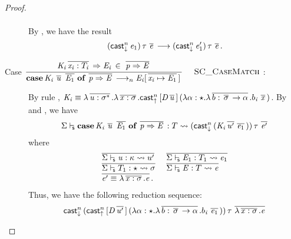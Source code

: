 \begin{proof}
\begin{description}
\[\begin{array}{l}
        \end{array} \] 
    By , we have the result
\[ (  \mathsf{cast}_{\downarrow}^n \, \mathit{e_{{\mathrm{1}}}}  ) \, \tau \, \,\overline{  \mathit{e}  }\,  \longrightarrow  (  \mathsf{cast}_{\downarrow}^n \, \mathit{e'_{{\mathrm{1}}}}  ) \, \tau \, \,\overline{  \mathit{e}  }\,. \]
        \item[Case \scriptsize{${\displaystyle\frac{\begin{array}{l} {\mathit{K_{\mathit{i}}} \,\overline{ \mathit{x_{\mathit{i}}} : T_{\mathit{i}} }\, \Rightarrow \mathit{E_{\mathit{i}}} \, \in \, \,\overline{ \mathit{p} \Rightarrow \mathit{E} }\,} \end{array}}{ \mathbf{case} \, \mathit{K_{\mathit{i}}} \, \,\overline{ \mathit{u} }\, \, \,\overline{ \mathit{E_{{\mathrm{1}}}} }\, \, \mathbf{of} \, \,\overline{ \mathit{p} \Rightarrow \mathit{E} }\, \longrightarrow_n \mathit{E_{\mathit{i}}} [ \,\overline{ \mathit{x_{\mathit{i}}} \mapsto \mathit{E_{{\mathrm{1}}}} }\, ] \,}\quad\textsc{ {\textsc{SC\_CaseMatch}}{} }}$}:] $\quad$ \\
        By rule , $\mathit{K_{\mathit{i}}}  \equiv  \lambda  \,\overline{  \mathit{u}  :  \sigma  ^{*}  }\,  .  \lambda  \,\overline{  \mathit{x}  :  \sigma  }\,  .  \mathsf{cast}_{\uparrow}^n \, [  \mathit{D}    \,\overline{  \mathit{u}  }\,  ] \,  (  \lambda  \alpha  :  \star  .  \lambda  \,\overline{  b  :  \,\overline{  \sigma  }\,  \rightarrow  \alpha  }\,  .  b_{\mathit{i}} \, \,\overline{  \mathit{x}  }\,  )$. By
 and , we have 
        \[
         \Sigma  \vdash_{\!\!\mathsf{s} }  \mathbf{case} \, \mathit{K_{\mathit{i}}} \, \,\overline{  \mathit{u}  }\, \, \,\overline{  \mathit{E_{{\mathrm{1}}}}  }\, \, \mathbf{of} \, \,\overline{  \mathit{p}  \Rightarrow  \mathit{E}  }\,  :  T   \rightsquigarrow   (  \mathsf{cast}_{\downarrow}^n \, (  \mathit{K_{\mathit{i}}}  \,\overline{  \mathit{u'}  }\,  \,\overline{  \mathit{e_{{\mathrm{1}}}}  }\,  )  ) \, \tau \, \,\overline{  \mathit{e'}  }\, 
        \]
where
        \[ \begin{array}{ll}
                \,\overline{   \Sigma  \labeledjudge{s}  \ottnt{u}  :  \kappa   \rightsquigarrow   u'   }\,
                & \,\overline{   \Sigma  \labeledjudge{s}  \ottnt{E_{{\mathrm{1}}}}  :  T_{{\mathrm{1}}}   \rightsquigarrow   \ottnt{e_{{\mathrm{1}}}}   }\, \\
                \,\overline{   \Sigma  \labeledjudge{s}  T_{{\mathrm{1}}}  :  \star   \rightsquigarrow   \sigma   }\,
                & \,\overline{   \Sigma  \labeledjudge{s}  \ottnt{E}  :  T   \rightsquigarrow   \ottnt{e}   }\, \\
                \,\overline{  \ottnt{e'}  \equiv  \lambda  \,\overline{  \ottmv{x}  \ottsym{:}  \sigma  }\,  \ottsym{.}  \ottnt{e}  }\,.
        \end{array} \]
        Thus, we have the following reduction sequence:
        \begin{align*}
            &\mathsf{cast}_{\downarrow}^n \, \ottsym{(}  \mathsf{cast}_{\uparrow}^n \, \ottsym{[}  \ottmv{D}    \,\overline{  \ottnt{u'}  }\,  \ottsym{]} \,  \ottsym{(}  \lambda  \alpha  \ottsym{:}  \star  \ottsym{.}  \lambda  \,\overline{  b  \ottsym{:}  \,\overline{  \sigma  }\,  \rightarrow  \alpha  }\,  \ottsym{.}  b_{\ottmv{i}} \, \,\overline{  \ottnt{e_{{\mathrm{1}}}}  }\,  \ottsym{)}  \ottsym{)} \, \tau \, \,\overline{  \lambda  \,\overline{  \ottmv{x}  \ottsym{:}  \sigma  }\,  \ottsym{.}  \ottnt{e}  }\, \\

\end{align*}
\end{description}
\end{proof}
